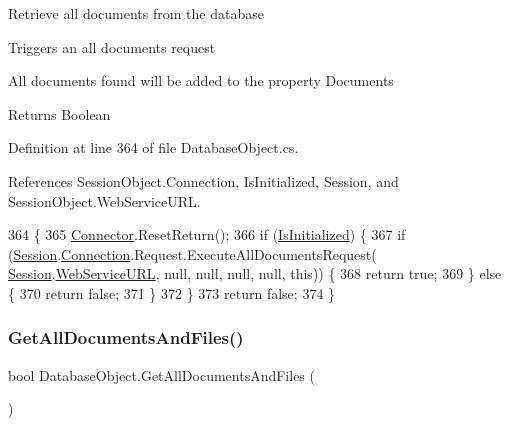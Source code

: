 Retrieve all documents from the database 

Triggers an all documents request

All documents found will be added to the property \textquotesingle{}Documents\textquotesingle{}

\begin{DoxyReturn}{Returns}
Boolean
\end{DoxyReturn}


Definition at line 364 of file Database\+Object.\+cs.



References Session\+Object.\+Connection, Is\+Initialized, Session, and Session\+Object.\+Web\+Service\+U\+RL.


\begin{DoxyCode}
364                                   \{
365         \mbox{\hyperlink{class_connector}{Connector}}.ResetReturn();
366         \textcolor{keywordflow}{if} (\mbox{\hyperlink{class_database_object_a5fe036d32a30eb10d1b3f6a30263f740}{IsInitialized}}) \{
367             \textcolor{keywordflow}{if} (\mbox{\hyperlink{class_database_object_aa8484162b7d2a7c4c9426bca13c64c07}{Session}}.\mbox{\hyperlink{class_session_object_a014bdbf705a753540e19bfb53030c55c}{Connection}}.Request.ExecuteAllDocumentsRequest(
      \mbox{\hyperlink{class_database_object_aa8484162b7d2a7c4c9426bca13c64c07}{Session}}.\mbox{\hyperlink{class_session_object_a697c071c812fbf7ad1166b896fb44c16}{WebServiceURL}}, null, null, null, null, \textcolor{keyword}{this})) \{
368                 \textcolor{keywordflow}{return} \textcolor{keyword}{true};
369             \} \textcolor{keywordflow}{else} \{
370                 \textcolor{keywordflow}{return} \textcolor{keyword}{false};
371             \}
372         \}
373         \textcolor{keywordflow}{return} \textcolor{keyword}{false};
374     \}
\end{DoxyCode}
\mbox{\label{class_database_object_a72239fa2b2a549665e45cdd340cd70a0}} 
\subsubsection{\texorpdfstring{Get\+All\+Documents\+And\+Files()}{GetAllDocumentsAndFiles()}}
{\footnotesize\ttfamily bool Database\+Object.\+Get\+All\+Documents\+And\+Files (\begin{DoxyParamCaption}{ }\end{DoxyParamCaption})}



